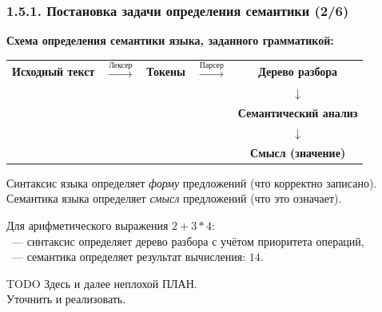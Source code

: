 \documentclass[mathserif,12pt,aspectratio=169]{beamer}
\def\NB#1{{\bf\color{brown}#1}}
\def\TODO#1{{\color{gray} TODO {#1}}}
\begin{document}
\begin{frame}
\frametitle{1.5.1. Постановка задачи определения семантики (2/6)}

\NB{Схема определения семантики языка, заданного грамматикой:}

\medskip
\begin{center}
\begin{tabular}{ccccc}
\textbf{Исходный текст} & $\xrightarrow{\text{Лексер}}$ & \textbf{Токены} & 
$\xrightarrow{\text{Парсер}}$ & \textbf{Дерево разбора} \\
& & & & $\downarrow$ \\
& & & & \textbf{Семантический анализ} \\
& & & & $\downarrow$ \\
& & & & \textbf{Смысл (значение)}
\end{tabular}
\end{center}

\begin{remark}
Синтаксис языка определяет \emph{форму} предложений (что корректно записано).\\
Семантика языка определяет \emph{смысл} предложений (что это означает).
\end{remark}

\begin{example}
Для арифметического выражения $2 + 3 * 4$:\\
~--- синтаксис определяет дерево разбора с учётом приоритета операций,\\
~--- семантика определяет результат вычисления: $14$.
\end{example}

\bigskip
\TODO{Здесь и далее неплохой ПЛАН. \\
Уточнить и реализовать. }

\end{frame}

\end{document}
